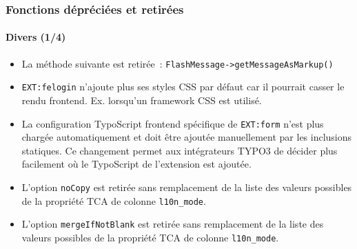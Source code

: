 \begin{frame}[fragile]
	\frametitle{Fonctions dépréciées et retirées}
	\framesubtitle{Divers (1/4)}


	\begin{itemize}
		\item La méthode suivante est retirée~:\newline
			\small\texttt{FlashMessage->getMessageAsMarkup()}\normalsize
		\item \texttt{EXT:felogin} n'ajoute plus ses styles CSS par défaut car il
			pourrait casser le rendu frontend. Ex. lorsqu'un framework CSS est utilisé.
		\item La configuration TypoScript frontend spécifique de \texttt{EXT:form} n'est
			plus chargée automatiquement et doit être ajoutée manuellement par les inclusions
			statiques. Ce changement permet aux intégrateurs TYPO3 de décider plus facilement
			où le TypoScript de l'extension est ajoutée.
		\item L'option \texttt{noCopy} est retirée sans remplacement de la liste des valeurs
			possibles de la propriété TCA de colonne \texttt{l10n\_mode}.
		\item L'option \texttt{mergeIfNotBlank} est retirée sans remplacement de la liste des
			valeurs possibles de la propriété TCA de colonne \texttt{l10n\_mode}.

	\end{itemize}

\end{frame}



